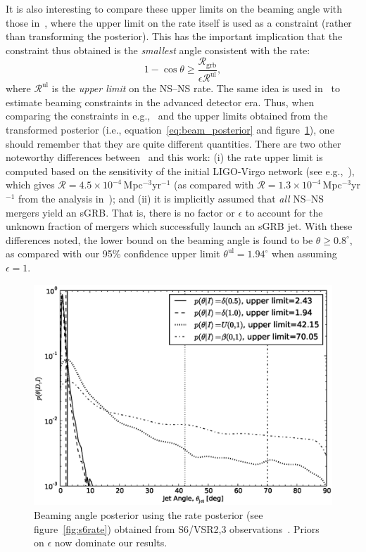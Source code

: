 \documentclass[twocolumn,nofootinbib]{revtex4-1}
\newcommand{\grbrate}{{{\mathcal R}_{\mathrm{grb}}}}
\newcommand{\cbcrate}{{{\mathcal R}}}
\newcommand{\BNS}{\ac{NS}--\ac{NS}\xspace}
\begin{document}
It is also interesting to compare these upper limits on the beaming angle with those in~\cite{2013PhRvL.111r1101C}, where the upper limit on the rate itself is used as a constraint (rather than transforming the posterior).
This has the important implication that the constraint thus obtained is the \emph{smallest} angle consistent with the rate:
%
\begin{equation}
    1 - \cos \theta \geq \frac{\grbrate}{\epsilon \cbcrate^{\mathrm{ul}}},
\end{equation}
%
where $\cbcrate^{\mathrm{ul}}$ is the \emph{upper limit} on the \BNS rate.
The same idea is used in~\cite{Clark:2014jpa} to estimate beaming constraints in the advanced detector era.
Thus, when comparing the constraints in e.g.,~\cite{2013PhRvL.111r1101C} and the upper limits obtained from the transformed posterior (i.e., equation~\ref{eq:beam_posterior} and figure~\ref{fig:s6angle}), one should remember that they are quite different quantities.
There are two other noteworthy differences between~\cite{2013PhRvL.111r1101C} and this work: (i) the rate upper limit is computed based on the sensitivity of the initial LIGO-Virgo network (see e.g.,~\cite{BradyFairhurst08}), which gives $\cbcrate=4.5\times 10^{-4}$\,Mpc$^{-3}$yr$^{-1}$ (as compared with $\cbcrate=1.3 \times 10^{-4}$\,Mpc$^{-3}$yr$^{-1}$ from the analysis in~\cite{Colaboration:2011np}); and (ii) it is implicitly assumed that \emph{all} \BNS mergers yield an \ac{sGRB}.
That is, there is no factor or $\epsilon$ to account for the unknown fraction of mergers which successfully launch an \ac{sGRB} jet.
With these differences noted, the lower bound on the beaming angle is found to be $\theta \geq 0.8^{\circ}$, as compared with our 95\% confidence upper limit $\theta^{\mathrm{ul}}=1.94^{\circ}$ when assuming $\epsilon=1$.

\begin{figure}
\centering
\includegraphics[width=\linewidth]{jet_angle_posterior_iligo.eps}
\caption{Beaming angle posterior using the rate posterior (see figure~\ref{fig:s6rate}) obtained from S6/VSR2,3 observations~\cite{Colaboration:2011np}.
    Priors on $\epsilon$ now dominate our results.
    \label{fig:s6angle}}
\end{figure}
\end{document}
